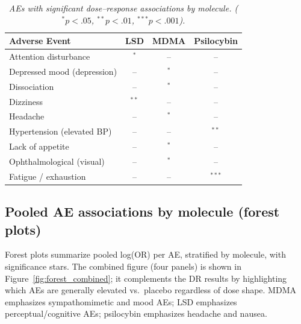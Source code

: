 \documentclass[12pt,a4paper]{article}
\begin{document}
\begin{table}[htb]
\centering
\caption{\textit{AEs with significant dose--response associations by molecule. ($^*p<.05$, $^{**}p<.01$, $^{***}p<.001$).}}
\label{tab:ae-by-mol}
\begin{tabular}{lccc}
\toprule
Adverse Event                  & \textbf{LSD} & \textbf{MDMA} & \textbf{Psilocybin} \\
\midrule
Attention disturbance          & $^*$         & --            & -- \\
Depressed mood (depression)    & --           & $^*$          & -- \\
Dissociation                   & --           & $^*$          & -- \\
Dizziness                      & $^{**}$      & --            & -- \\
Headache                       & --           & $^*$          & -- \\
Hypertension (elevated BP)     & --           & --            & $^{**}$ \\
Lack of appetite               & --           & $^*$          & -- \\
Ophthalmological (visual)      & --           & $^*$          & -- \\
Fatigue / exhaustion           & --           & --            & $^{***}$ \\
\bottomrule
\end{tabular}
\end{table}

\subsection{Pooled AE associations by molecule (forest plots)}
Forest plots summarize pooled log(OR) per AE, stratified by molecule, with significance stars. The combined figure (four panels) is shown in Figure~\ref{fig:forest_combined}; it complements the DR results by highlighting which AEs are generally elevated vs.\ placebo regardless of dose shape. MDMA emphasizes sympathomimetic and mood AEs; LSD emphasizes perceptual/cognitive AEs; psilocybin emphasizes headache and nausea.
\end{document}
